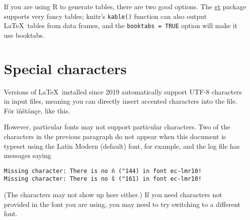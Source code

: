 If you are using R to generate tables, there are two good options. The
\href{https://gt.rstudio.com/}{gt} package supports very fancy tables; knitr's
\texttt{kable()} function can also output \LaTeX\ tables from data frames, and
the \texttt{booktabs = TRUE} option will make it use booktabs.

\section{Special characters}

Versions of \LaTeX\ installed since 2019 automatically support UTF-8 characters
in input files, meaning you can directly insert accented characters into the
file. För ïńštånçe, like this.

However, particular fonts may not support particular characters. Two of the
characters in the previous paragraph do not appear when this document is typeset
using the Latin Modern (default) font, for example, and the log file has
messages saying
\begin{verbatim}
Missing character: There is no ń ("144) in font ec-lmr10!
Missing character: There is no š ("161) in font ec-lmr10!
\end{verbatim}
(The characters may not show up here either.) If you need characters not
provided in the font you are using, you may need to try switching to a different
font.
